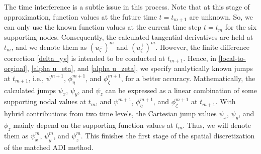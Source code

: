 \documentclass[dissertation]{uathesis}
\begin{document}
\begin{body}
\begin{flushleft}
\hspace{1cm} The time interference is a subtle issue in this process. 
Note that at this stage of approximation, function values at the future time $t=t_{m+1}$ are unknown. 
So, we can only use the known function values at the current time step $t=t_{m}$ for 
the six supporting nodes. 
Consequently, the calculated tangential derivatives are held at $t_{m}$, and 
we denote them as $(u^{-}_{\zeta})^m$ and $(u^{+}_{\zeta})^m$. 
However, the finite difference correction \eqref{delta_yy} is intended to be conducted at $t_{m+1}$. Hence, in \eqref{local-to-orginal}, \eqref{alpha u_eta}, and \eqref{alpha u_zeta},  we specify analytically known jumps at $t_{m+1}$, i.e., $\psi^{m+1}$, $\phi_{\eta}^{m+1}$, and  $\phi_{\zeta}^{m+1}$, for a better accuracy. 
Mathematically, the calculated jumps $\psi_x$, $\psi_y$, and $\psi_z$ can be expressed as a linear combination of some supporting nodal values at $t_m$, and $\psi^{m+1}$, $\phi_{\eta}^{m+1}$, and  $\phi_{\zeta}^{m+1}$ at $t_{m+1}$. 
With hybrid contributions from two time levels, the Cartesian jump values $\psi_x$, $\psi_y$, and $\phi_z$ mainly depend on the supporting function values at $t_m$.
Thus, we will denote them as $\psi^m_x$, $\psi^m_y$, and $\psi^m_z$.
This finishes the first stage of the spatial discretization of the matched ADI method. 


\end{flushleft}
\end{body}
\end{document}
